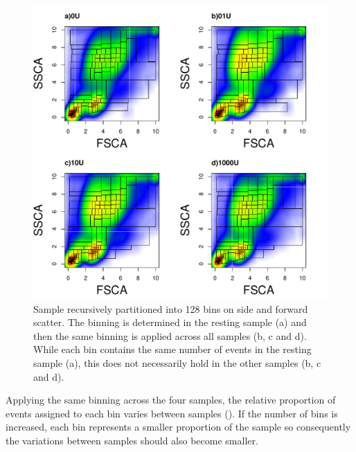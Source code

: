 \begin{figure}[!h]
    \centering
    \includegraphics[scale=.75]{figures/scatter-rpart-128bin-var}
{Sample recursively partitioned into 128 bins on side and forward scatter.}
{
   The binning is determined in the resting sample (a) and then the same binning is applied across all samples (b, c and d).
   While each bin contains the same number of events in the resting sample (a), this does not necessarily hold in the
   other samples (b, c and d).
}
\end{figure}

Applying the same binning across the four samples, the relative proportion of events assigned to each bin varies between samples ().
If the number of bins is increased, each bin represents a smaller proportion of the sample so consequently the variations between samples should also become smaller.

